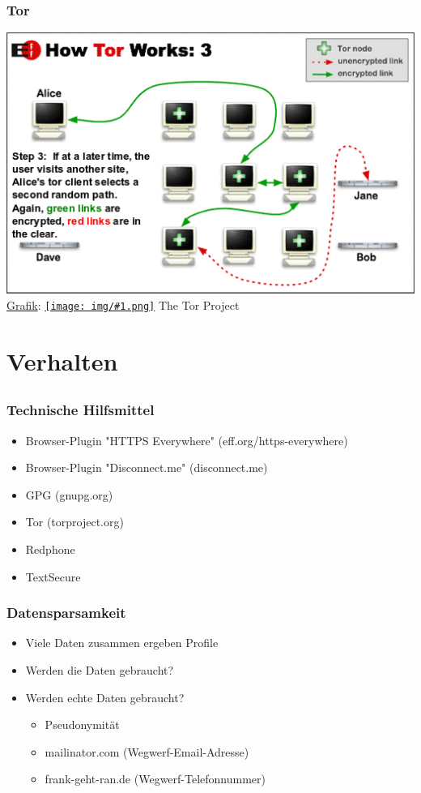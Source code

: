 \documentclass[12pt]{beamer}
\newcommand{\cc}[1]{\texttt{[image: img/\#1.png]}}
\begin{document}
\begin{frame}
    \frametitle{Tor}
    \includegraphics[height=0.7\textheight]{img/tor3.png}
    \\{\small \href{https://www.torproject.org/images/htw3.png}{Grafik}: \href{https://creativecommons.org/licenses/by/3.0/us/}{\cc{by}} The Tor Project}
\end{frame}

\section{Verhalten}
\subsection{}

\begin{frame}
    \frametitle{Technische Hilfsmittel}
    \begin{itemize}
        \item Browser-Plugin "HTTPS Everywhere" (eff.org/https-everywhere)
        \item Browser-Plugin "Disconnect.me" (disconnect.me)
        \item GPG (gnupg.org)
        \item Tor (torproject.org)
        \item Redphone
        \item TextSecure
    \end{itemize}
\end{frame}

\begin{frame}
    \frametitle{Datensparsamkeit}
    \begin{itemize}
        \item<2-> Viele Daten zusammen ergeben Profile
        \item<3-> Werden die Daten gebraucht?
        \item<4-> Werden echte Daten gebraucht?
            \begin{itemize}
              \item<5-> Pseudonymität
              \item<6-> mailinator.com (Wegwerf-Email-Adresse)
	      \item<7-> frank-geht-ran.de (Wegwerf-Telefonnummer)
            \end{itemize}
    \end{itemize}
\end{frame}
\end{document}
